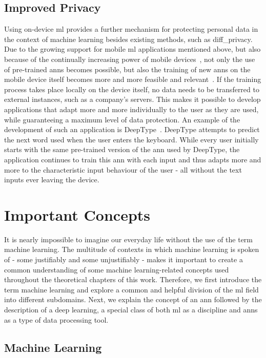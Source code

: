 \documentclass[
			   fontsize=11pt,
               paper=a4,
               bibliography=totoc,
               idxtotoc,
               headsepline,
               footsepline,
               footinclude=false,
               BCOR=12mm,
               DIV=13,
               openany,   %
               ]
               {scrbook}
\begin{document}
\section{Improved Privacy} \label{sec:privacy}

Using on-device \gls{ml} provides a further mechanism for protecting personal data in the context of machine learning besides existing methods, such as \gls{diff_privacy}. Due to the growing support for mobile \gls{ml} applications mentioned above, but also because of the continually increasing power of mobile devices~\cite{mobile_cpu_power}, not only the use of pre-trained \glspl{ann} becomes possible, but also the training of new \glspl{ann} on the mobile device itself becomes more and more feasible and relevant~\cite{liu19}. If the training process takes place locally on the device itself, no data needs to be transferred to external instances, such as a company's servers. This makes it possible to develop applications that adapt more and more individually to the user as they are used, while guaranteeing a maximum level of data protection. An example of the development of such an application is DeepType~\cite{deepType}. DeepType attempts to predict the next word used when the user enters the keyboard. While every user initially starts with the same pre-trained version of the \gls{ann} used by DeepType, the application continues to train this \gls{ann} with each input and thus adapts more and more to the characteristic input behaviour of the user - all without the text inputs ever leaving the device.


\chapter{Important Concepts}

It is nearly impossible to imagine our everyday life without the use of the term machine learning. The multitude of contexts in which machine learning is spoken of - some justifiably and some unjustifiably - makes it important to create a common understanding of some machine learning-related concepts used throughout the theoretical chapters of this work. Therefore, we first introduce the term machine learning and explore a common and helpful division of the \acrlong{ml} field into different subdomains. Next, we explain the concept of an \acrlong{ann} followed by the description of a deep learning, a special class of both \acrfull{ml} as a discipline and \glspl{ann} as a type of data processing tool.

\section{Machine Learning}
\end{document}
